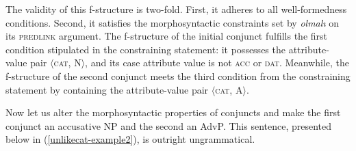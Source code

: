 \pex
{}
\xe

\begin{sloppypar}
The validity of this f-structure is two-fold. First, it adheres to all well-formedness conditions. Second, it satisfies the morphosyntactic constraints set by \textit{olmalı} on its \textsc{predlink} argument. The f-structure of the initial conjunct fulfills the first condition stipulated in the constraining statement: it possesses the attribute-value pair $\langle$\textsc{cat}, N$\rangle$, and its case attribute value is not \textsc{acc} or \textsc{dat}. Meanwhile, the f-structure of the second conjunct meets the third condition from the constraining statement by containing the attribute-value pair $\langle$\textsc{cat}, A$\rangle$.
\end{sloppypar}

Now let us alter the morphosyntactic properties of conjuncts and make the first conjunct an accusative NP and the second an AdvP. This sentence, presented below in  (\ref{unlikecat-example2}), is outright ungrammatical.

